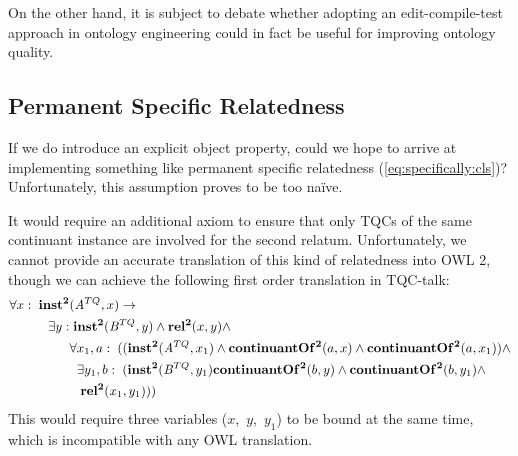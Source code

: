 On the other hand, it is subject to debate whether adopting an edit-compile-test
approach in ontology engineering could in fact be useful for improving ontology quality.

\subsection*{Permanent Specific Relatedness}
If we do introduce an explicit object property, could we hope to arrive at
implementing something like permanent specific relatedness
(\ref{eq:specifically:cls})? Unfortunately, this assumption proves to be too na\"ive.

It would require an additional axiom to ensure that only TQCs of the same continuant instance are involved
for the second relatum. Unfortunately, we cannot provide an
accurate translation of this kind of relatedness into OWL 2, though we can
achieve the following first order translation in TQC-talk:
 \begin{equation}
\begin{split}
\forall x:\; \mathrm{\mathbf{inst^2}}&(\mathit{A}^{TQ},x) \rightarrow \\
 \exists y:&\;\mathrm{\mathbf{inst^2}}(\mathit{B}^{TQ},y) \wedge \mathrm{\mathbf{rel^2}}(x,y)\wedge\\
 & \forall x_1,a:\; ((\mathrm{\mathbf{inst^2}}(\mathit{A}^{TQ},x_1) \wedge
\mathrm{\mathbf{continuantOf^2}}(a,x) \wedge \mathrm{\mathbf{continuantOf^2}}(a,x_1))\wedge\\
&\;\;\exists y_1,b:\;(\mathrm{\mathbf{inst^2}}(\mathit{B}^{TQ},y_1) \mathrm{\mathbf{continuantOf^2}}(b,y)  
\wedge \mathrm{\mathbf{continuantOf^2}}(b,y_1) \wedge\\&\;\;\;\mathrm{\mathbf{rel^2}}(x_1,y_1)))
\end{split}
\end{equation}
This would require three variables ($x$,~$y$,~$y_1$) to be bound at the same
time, which is incompatible with any OWL translation.

